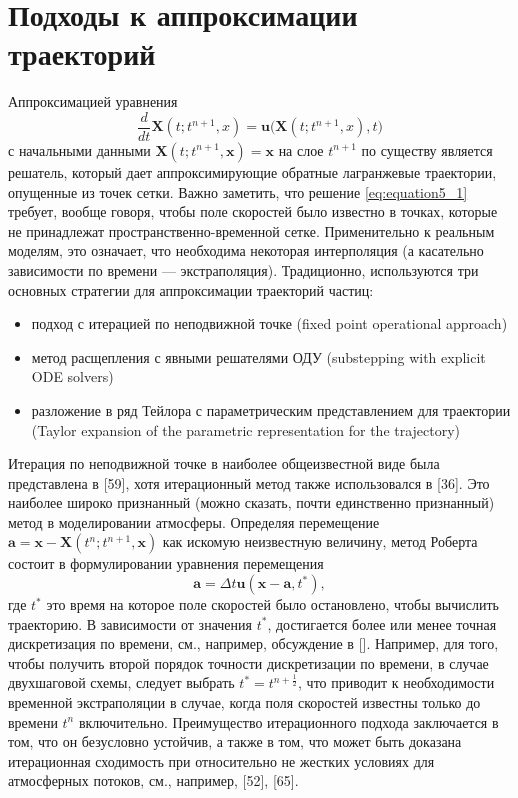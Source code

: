\section*{Подходы к аппроксимации траекторий} \label{sect5_1}
Аппроксимацией уравнения
%
\begin{equation}
\label{eq:equation5_1}
\frac{d}{dt}\mathbf{X}(t;t^{n+1},x) = \mathbf{u}\Big(\mathbf{X}(t;t^{n+1}, x),t\Big)
\end{equation}
%
с начальными данными $\mathbf{X}(t;t^{n+1},\mathbf{x})=\mathbf{x}$ на слое $t^{n+1}$ по существу является решатель, который дает аппроксимирующие обратные лагранжевые траектории, опущенные из точек сетки. Важно заметить, что решение \eqref{eq:equation5_1} требует, вообще говоря, чтобы поле скоростей было известно в точках, которые не принадлежат пространственно-временной сетке. Применительно к реальным моделям, это означает, что необходима некоторая интерполяция (а касательно зависимости по времени --- экстраполяция). Традиционно, используются три основных стратегии для аппроксимации траекторий частиц:
\begin{itemize}
	\item подход с итерацией по неподвижной точке (fixed point operational approach)
	\item метод расщепления с явными решателями ОДУ (substepping with explicit ODE solvers)
	\item разложение в ряд Тейлора с параметрическим представлением для траектории (Taylor expansion of the parametric representation for the trajectory)
\end{itemize}
Итерация по неподвижной точке в наиболее общеизвестной виде была представлена в [59], хотя итерационный метод также использовался в [36]. Это наиболее широко признанный (можно сказать, почти единственно признанный) метод в моделировании атмосферы. Определяя перемещение $\mathbf{a}=\mathbf{x} - \mathbf{X}(t^n;t^{n+1}, \mathbf{x})$ как искомую неизвестную величину, метод Роберта состоит в формулировании уравнения перемещения
%
\begin{equation}
\label{eq:equation5_2}
	\mathbf{a}=\Delta t \mathbf{u}(\mathbf{x} - \mathbf{a}, t^*),
\end{equation}
%
где $t^*$ это время на которое поле скоростей было остановлено, чтобы вычислить траекторию. В зависимости от значения $t^*$, достигается более или менее точная дискретизация по времени, см., например, обсуждение в []. Например, для того, чтобы получить второй порядок точности дискретизации по времени, в случае двухшаговой схемы, следует выбрать $t^*=t^{n+\frac{1}{2}}$, что приводит к необходимости временной экстраполяции в случае, когда поля скоростей известны только до времени $t^n$ включительно. Преимущество итерационного подхода заключается в том, что он безусловно устойчив, а также в том, что может быть доказана итерационная сходимость при относительно не жестких условиях для атмосферных потоков, см., например, [52], [65].

